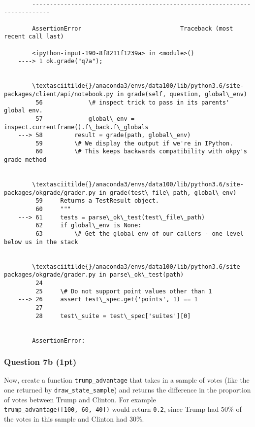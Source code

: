 \documentclass[11pt]{article}
\begin{document}
    \begin{Verbatim}[commandchars=\\\{\}]

        ---------------------------------------------------------------------------

        AssertionError                            Traceback (most recent call last)

        <ipython-input-190-8f8211f1239a> in <module>()
    ----> 1 ok.grade("q7a");
    

        \textasciitilde{}/anaconda3/envs/data100/lib/python3.6/site-packages/client/api/notebook.py in grade(self, question, global\_env)
         56             \# inspect trick to pass in its parents' global env.
         57             global\_env = inspect.currentframe().f\_back.f\_globals
    ---> 58         result = grade(path, global\_env)
         59         \# We display the output if we're in IPython.
         60         \# This keeps backwards compatibility with okpy's grade method


        \textasciitilde{}/anaconda3/envs/data100/lib/python3.6/site-packages/okgrade/grader.py in grade(test\_file\_path, global\_env)
         59     Returns a TestResult object.
         60     """
    ---> 61     tests = parse\_ok\_test(test\_file\_path)
         62     if global\_env is None:
         63         \# Get the global env of our callers - one level below us in the stack


        \textasciitilde{}/anaconda3/envs/data100/lib/python3.6/site-packages/okgrade/grader.py in parse\_ok\_test(path)
         24 
         25     \# Do not support point values other than 1
    ---> 26     assert test\_spec.get('points', 1) == 1
         27 
         28     test\_suite = test\_spec['suites'][0]


        AssertionError: 

    \end{Verbatim}

    \subsubsection{Question 7b (1pt)}\label{question-7b-1pt}

Now, create a function \texttt{trump\_advantage} that takes in a sample
of votes (like the one returned by \texttt{draw\_state\_sample}) and
returns the difference in the proportion of votes between Trump and
Clinton. For example \texttt{trump\_advantage({[}100,\ 60,\ 40{]})}
would return \texttt{0.2}, since Trump had 50\% of the votes in this
sample and Clinton had 30\%.
\end{document}
